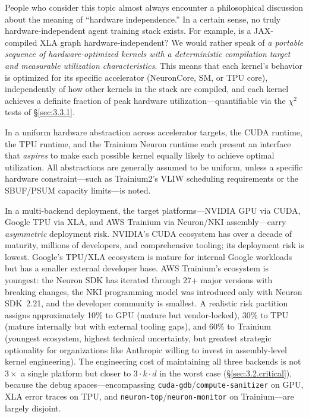 \documentclass[12pt]{article}
\newcommand{\SBUF}{\textsc{SBUF}}                 %
\newcommand{\PSUM}{\textsc{PSUM}}                 %
\begin{document}
\medskip




\bigskip

People who consider this topic almost always encounter a philosophical discussion about the meaning of ``hardware independence.'' In a certain sense, no truly hardware-independent agent training stack exists. For example, is a JAX-compiled XLA graph hardware-independent? We would rather speak of \emph{a portable sequence of hardware-optimized kernels with a deterministic compilation target and measurable utilization characteristics}. This means that each kernel's behavior is optimized for its specific accelerator (NeuronCore, SM, or TPU core), independently of how other kernels in the stack are compiled, and each kernel achieves a definite fraction of peak hardware utilization---quantifiable via the $\chi^2$ tests of \S\ref{sec:3.3.1}.

In a uniform hardware abstraction across accelerator targets, the CUDA runtime, the TPU runtime, and the Trainium Neuron runtime each present an interface that \emph{aspires} to make each possible kernel equally likely to achieve optimal utilization. All abstractions are generally assumed to be uniform, unless a specific hardware constraint---such as Trainium2's VLIW scheduling requirements or the \SBUF{}/\PSUM{} capacity limits---is noted.

In a multi-backend deployment, the target platforms---NVIDIA GPU via CUDA, Google TPU via XLA, and AWS Trainium via Neuron/NKI assembly---carry \emph{asymmetric} deployment risk. NVIDIA's CUDA ecosystem has over a decade of maturity, millions of developers, and comprehensive tooling; its deployment risk is lowest. Google's TPU/XLA ecosystem is mature for internal Google workloads but has a smaller external developer base. AWS Trainium's ecosystem is youngest: the Neuron SDK has iterated through 27+ major versions with breaking changes, the NKI programming model was introduced only with Neuron SDK~2.21, and the developer community is smallest. A realistic risk partition assigns approximately 10\% to GPU (mature but vendor-locked), 30\% to TPU (mature internally but with external tooling gaps), and 60\% to Trainium (youngest ecosystem, highest technical uncertainty, but greatest strategic optionality for organizations like Anthropic willing to invest in assembly-level kernel engineering). The engineering cost of maintaining all three backends is not $3\times$ a single platform but closer to $3 \cdot k \cdot d$ in the worst case (\S\ref{sec:3.2.critical}), because the debug spaces---encompassing \texttt{cuda-gdb}/\texttt{compute-sanitizer} on GPU, XLA error traces on TPU, and \texttt{neuron-top}/\texttt{neuron-monitor} on Trainium---are largely disjoint.
\end{document}
